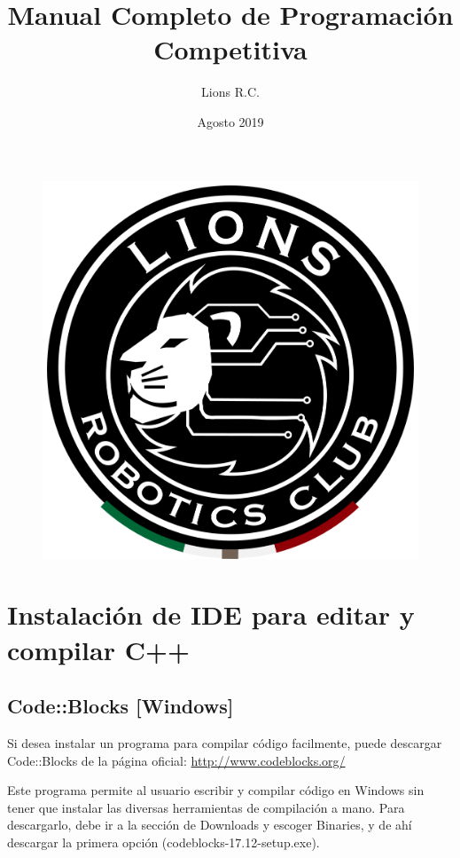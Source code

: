 \documentclass{article}
\title{Manual Completo de Programación Competitiva}
\author{Lions R.C.}
\date{Agosto 2019}
\begin{document}
\maketitle

\begin{figure}[H]
    \centering
    \includegraphics[width=0.2\paperwidth]{newblack}
\end{figure}

\tableofcontents

\section{Instalación de IDE para editar y compilar C++}

\subsection{Code::Blocks [Windows]}
Si desea instalar un programa para compilar código facilmente, puede descargar Code::Blocks de la página oficial: \url{http://www.codeblocks.org/}

Este programa permite al usuario escribir y compilar código en Windows sin tener que instalar las diversas herramientas de compilación a mano. Para descargarlo, debe ir a la sección de Downloads y escoger Binaries, y de ahí descargar la primera opción (codeblocks-17.12-setup.exe).
\end{document}
